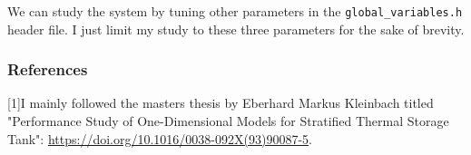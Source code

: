 \documentclass{article}
\begin{document}
We can study the system by tuning other parameters in the \texttt{global\_variables.h} header file. I just limit my study to these three parameters for the sake of brevity. 


\subsubsection*{References}
[1]I mainly followed the masters thesis by Eberhard Markus Kleinbach titled "Performance Study of One-Dimensional Models for Stratified Thermal Storage Tank": \url{https://doi.org/10.1016/0038-092X(93)90087-5}.
\end{document}
